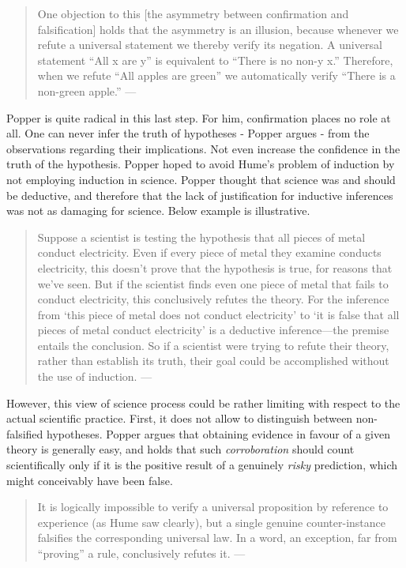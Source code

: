 \documentclass[
]{book}
\begin{document}
\begin{quote}
One objection to this {[}the asymmetry between confirmation and falsification{]} holds that the asymmetry is an illusion, because whenever we refute a universal statement we thereby verify its negation. A universal statement ``All x are y'' is equivalent to ``There is no non-y x.'' Therefore, when we refute ``All apples are green'' we automatically verify ``There is a non-green apple.'' --- \citep{percival2015confirmation}
\end{quote}

Popper is quite radical in this last step. For him, confirmation places no role at all. One can never infer the truth of hypotheses - Popper argues - from the observations regarding their implications. Not even increase the confidence in the truth of the hypothesis. Popper hoped to avoid Hume's problem of induction by not employing induction in science. Popper thought that science was and should be deductive, and therefore that the lack of justification for inductive inferences was not as damaging for science. Below example is illustrative.

\begin{quote}
Suppose a scientist is testing the hypothesis that all pieces of metal conduct electricity. Even if every piece of metal they examine conducts electricity, this doesn't prove that the hypothesis is true, for reasons that we've seen. But if the scientist finds even one piece of metal that fails to conduct electricity, this conclusively refutes the theory. For the inference from `this piece of metal does not conduct electricity' to `it is false that all pieces of metal conduct electricity' is a deductive inference---the premise entails the conclusion. So if a scientist were trying to refute their theory, rather than establish its truth, their goal could be accomplished without the use of induction. --- \citep{okasha-pos}
\end{quote}

However, this view of science process could be rather limiting with respect to the actual scientific practice. First, it does not allow to distinguish between non-falsified hypotheses. Popper argues that obtaining evidence in favour of a given theory is generally easy, and holds that such \emph{corroboration} should count scientifically only if it is the positive result of a genuinely \emph{risky} prediction, which might conceivably have been false.

\begin{quote}
It is logically impossible to verify a universal proposition by reference to experience (as Hume saw clearly), but a single genuine counter-instance falsifies the corresponding universal law. In a word, an exception, far from ``proving'' a rule, conclusively refutes it. --- \citep{sep-popper}
\end{quote}
\end{document}
